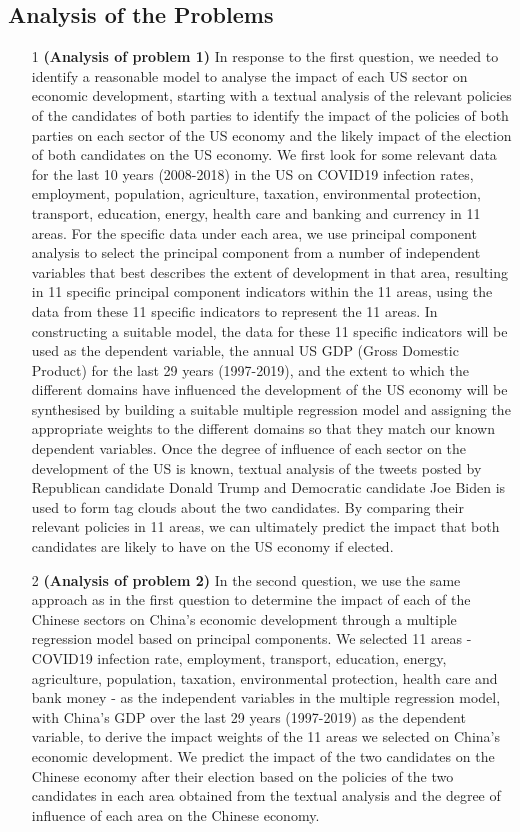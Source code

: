 \documentclass{apmcmthesis}
\begin{document}
\subsection{Analysis of the Problems}

\begin{enumerate}
	\item[1] \textbf{(Analysis of problem 1)}
	In response to the first question, we needed to identify a reasonable model to analyse the impact of each US sector on economic development, starting with a textual analysis of the relevant policies of the candidates of both parties to identify the impact of the policies of both parties on each sector of the US economy and the likely impact of the election of both candidates on the US economy. We first look for some relevant data for the last 10 years (2008-2018) in the US on COVID19 infection rates, employment, population, agriculture, taxation, environmental protection, transport, education, energy, health care and banking and currency in 11 areas. For the specific data under each area, we use principal component analysis to select the principal component from a number of independent variables that best describes the extent of development in that area, resulting in 11 specific principal component indicators within the 11 areas, using the data from these 11 specific indicators to represent the 11 areas. In constructing a suitable model, the data for these 11 specific indicators will be used as the dependent variable, the annual US GDP (Gross Domestic Product) for the last 29 years (1997-2019), and the extent to which the different domains have influenced the development of the US economy will be synthesised by building a suitable multiple regression model and assigning the appropriate weights to the different domains so that they match our known dependent variables. Once the degree of influence of each sector on the development of the US is known, textual analysis of the tweets posted by Republican candidate Donald Trump and Democratic candidate Joe Biden is used to form tag clouds about the two candidates. By comparing their relevant policies in 11 areas, we can ultimately predict the impact that both candidates are likely to have on the US economy if elected.
	\item[2] \textbf{(Analysis of problem 2)}
	In the second question, we use the same approach as in the first question to determine the impact of each of the Chinese sectors on China's economic development through a multiple regression model based on principal components. We selected 11 areas - COVID19 infection rate, employment, transport, education, energy, agriculture, population, taxation, environmental protection, health care and bank money - as the independent variables in the multiple regression model, with China's GDP over the last 29 years (1997-2019) as the dependent variable, to derive the impact weights of the 11 areas we selected on China's economic development. We predict the impact of the two candidates on the Chinese economy after their election based on the policies of the two candidates in each area obtained from the textual analysis and the degree of influence of each area on the Chinese economy.

\end{enumerate}
\end{document}
